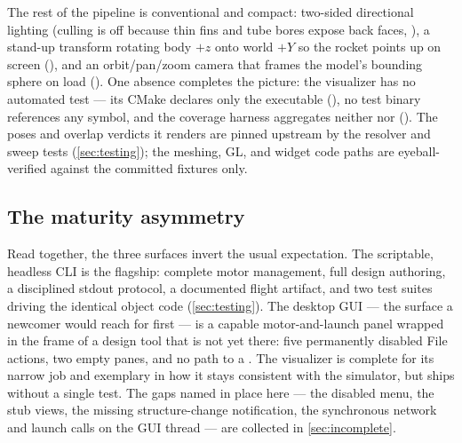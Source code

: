 The rest of the pipeline is conventional and compact: two-sided directional lighting
(culling is off because thin fins and tube bores expose back faces,
), a stand-up transform rotating body $+z$ onto
world $+Y$ so the rocket points up on screen (), and
an orbit/pan/zoom camera that frames the model's bounding sphere on load
(). One absence completes the picture: the
visualizer has no automated test --- its CMake declares only the executable
(), no test binary references any  symbol, and the
coverage harness aggregates neither  nor 
(). The poses and overlap verdicts it renders are pinned upstream
by the resolver and sweep tests (\cref{sec:testing}); the meshing, GL, and widget code paths
are eyeball-verified against the committed  fixtures only.

\subsection{The maturity asymmetry}\label{sec:interfaces-asymmetry}

Read together, the three surfaces invert the usual expectation. The scriptable, headless CLI
is the flagship: complete motor management, full design authoring, a disciplined stdout
protocol, a documented flight artifact, and two test suites driving the identical object
code (\cref{sec:testing}). The desktop GUI --- the surface a newcomer would reach for first
--- is a capable motor-and-launch panel wrapped in the frame of a design tool that is not
yet there: five permanently disabled File actions, two empty panes, and no path to a
. The visualizer is complete for its narrow job and exemplary in how it stays
consistent with the simulator, but ships without a single test. The gaps named in place here
--- the disabled menu, the stub views, the missing structure-change notification, the
synchronous network and launch calls on the GUI thread --- are collected in
\cref{sec:incomplete}.
